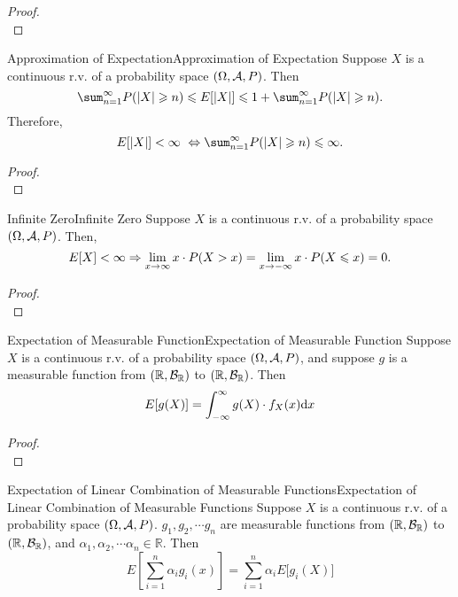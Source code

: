 \documentclass{elegantbook}
\begin{document}
\begin{proof}
\\[4cm]\vspace{0.01cm}
\end{proof}

\begin{theorem}{Approximation of Expectation}{Approximation of Expectation}
Suppose $X$ is a continuous r.v. of a probability space $(\Omega,\mathcal{A}, P)$. Then
$$
\sum_{n = 1}^{\infty}{P(|X| \gs n)} \ls E\lbrack|X|\rbrack \ls 1 + \sum_{n = 1}^{\infty}{P( \left| X \right| \gs n )}.
$$
Therefore,
$$
E\lbrack|X|\rbrack < \infty\  \Leftrightarrow \sum_{n = 1}^{\infty}{P(|X| \gs n)} \ls \infty.
$$
\end{theorem}

\begin{proof}
\\[4cm]\vspace{0.01cm}
\end{proof}

\begin{theorem}{Inf\/inite Zero}{Infinite Zero}
Suppose $X$ is a continuous r.v. of a probability space $(\Omega,\mathcal{A}, P)$. Then,
$$
E\lbrack X\rbrack < \infty \Rightarrow \lim_{x \rightarrow \infty}{x \cdot P(X > x)} = \lim_{x \rightarrow - \infty}{x \cdot P(X \leqslant x)} = 0.
$$
\end{theorem}

\begin{proof}
\\[4cm]\vspace{0.01cm}
\end{proof}

\begin{theorem}{Expectation of Measurable Function}{Expectation of Measurable Function}
Suppose $X$ is a continuous r.v. of a probability space $(\Omega,\mathcal{A}, P)$, and suppose $g$ is a measurable function from $(\mathbb{R},\mathcal{B}_\mathbb{R})$ to $(\mathbb{R},\mathcal{B}_\mathbb{R})$.
Then
\[E\lbrack g(X)\rbrack = \int_{- \infty}^{\infty}{g(X)} \cdot f_{X}(x)\dif x\]
\end{theorem}

\begin{proof}
\\[4cm]\vspace{0.01cm}
\end{proof}

\begin{corollary}{Expectation of Linear Combination of Measurable Functions}{Expectation of Linear Combination of Measurable Functions}
Suppose $X$ is a continuous r.v. of a probability space $(\Omega,\mathcal{A}, P)$. $g_1,g_2,\cdots g_n$ are measurable functions from $(\mathbb{R},\mathcal{B}_\mathbb{R})$ to $(\mathbb{R},\mathcal{B}_\mathbb{R})$, and $\alpha_1,\alpha_2,\cdots\alpha_n\in\mathbb{R}$. Then
\[E\left\lbrack \sum_{i = 1}^{n}\alpha_{i}g_{i}(x) \right\rbrack = \sum_{i = 1}^{n}\alpha_{i}E\lbrack g_{i}(X)\rbrack\]
\end{corollary}
\end{document}
